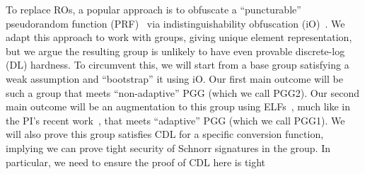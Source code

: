 
To replace ROs, a popular approach is to obfuscate a ``puncturable'' pseudorandom function (PRF)~\cite{STOC:SahWat14} via  indistinguishability obfuscation (iO)~\cite{DBLP:journals/jacm/BarakGIRSVY12,FOCs:GGHRSW13,JACM:JaiLinSai24}. We adapt this   approach to work with groups, giving unique element representation,  but we argue the resulting group is unlikely to have even provable discrete-log (DL) hardness. To circumvent this, we will start from a base group satisfying a weak assumption and  ``bootstrap'' it using iO.  Our first main outcome will be such a group that meets ``non-adaptive'' PGG (which we call PGG2).  Our second main outcome will be an augmentation to this group using  ELFs~\cite{C:Zhandry16}, much like in the PI's recent work~\cite{AC:MurONeZah22}, that meets ``adaptive'' PGG (which we call PGG1). We will also prove this group satisfies CDL for a specific conversion function,  implying we can prove tight security of Schnorr signatures in the group. In particular,  we need to ensure the proof of CDL here is tight
\fi



